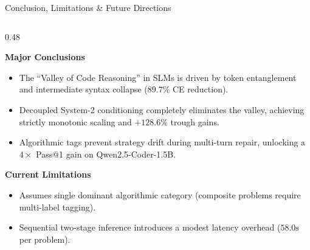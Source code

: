 \documentclass[aspectratio=169,10pt]{beamer}
\begin{document}
\begin{frame}{Conclusion, Limitations \& Future Directions}
  \begin{columns}[T]
    \begin{column}{0.48\textwidth}
      \begin{block}{\textbf{Major Conclusions}}
        \begin{itemize}\itemsep=2pt\scriptsize
          \item The ``Valley of Code Reasoning'' in SLMs is driven by token entanglement and intermediate syntax collapse ($89.7\%$ CE reduction).
          \item Decoupled System-2 conditioning completely eliminates the valley, achieving strictly monotonic scaling and $+128.6\%$ trough gains.
          \item Algorithmic tags prevent strategy drift during multi-turn repair, unlocking a $4\times$ Pass@1 gain on Qwen2.5-Coder-1.5B.
        \end{itemize}
      \end{block}
      \vspace{2pt}
      \begin{alertblock}{\textbf{Current Limitations}}
        \begin{itemize}\itemsep=2pt\scriptsize
          \item Assumes single dominant algorithmic category (composite problems require multi-label tagging).
          \item Sequential two-stage inference introduces a modest latency overhead ($58.0\text{s}$ per problem).
        \end{itemize}
      \end{alertblock}
    \end{column}


\end{columns}
\end{frame}
\end{document}
